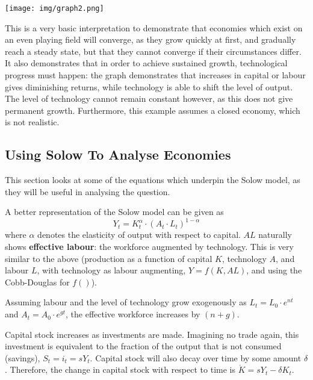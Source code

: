 \documentclass[12pt]{article}
\begin{document}
\texttt{[image: img/graph2.png]}
\newline

This is a very basic interpretation to demonstrate that economies which exist on an even 
playing field will converge, as they grow quickly at first, and gradually reach a steady 
state, but that they cannot converge if their circumstances differ. It also demonstrates 
that in order to achieve sustained growth, technological progress must happen: the graph 
demonstrates that increases in capital or labour gives diminishing returns, while 
technology is able to shift the level of output. The level of technology cannot remain 
constant however, as this does not give permanent growth. Furthermore, this example 
assumes a closed economy, which is not realistic. 
\newline

\subsection{Using Solow To Analyse Economies}

This section looks at some of the equations which underpin the Solow model, as they will be useful 
in analysing the question.
\newline

A better representation of the Solow model can be given as
\[ Y_{t} = K_{t}^{\alpha} \cdot (A_{t} \cdot L_{t})^{1-\alpha} \]
where $\alpha$ denotes the elasticity of output with respect to capital. $AL$ 
naturally shows \textbf{effective labour}: the workforce augmented by technology. This 
is very similar to the above (production as a function of capital $K$, technology $A$, and 
labour $L$, with technology as labour augmenting, \(Y = f(K, AL)\), and using the 
Cobb-Douglas for $f()$).
\newline

Assuming labour and the level of technology grow exogenously as 
\(L_{t} = L_{0} \cdot e^{nt} \) and \(A_{t} = A_{0} \cdot e^{gt} \), the effective 
workforce increases by \((n + g)\).
\newline 

Capital stock increases as investments are made. Imagining no trade
again, this investment is equivalent to the fraction of the output that is not 
consumed (savings), \(S_{t} = i_{t} = sY_{t}\). Capital stock will also decay over time 
by some amount $\delta$. Therefore, the change in capital stock with respect to time is 
\( \dot{K} = sY_{t} - \delta K_{t} \). 
\newline 
\end{document}
